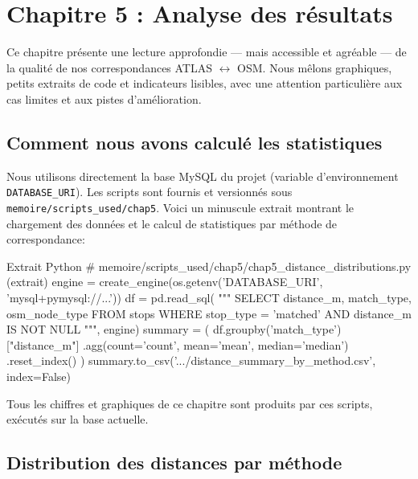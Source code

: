 \chapter{Chapitre 5 : Analyse des résultats}

Ce chapitre présente une lecture approfondie — mais accessible et agréable — de la qualité de nos correspondances ATLAS $\leftrightarrow$ OSM. Nous mêlons graphiques, petits extraits de code et indicateurs lisibles, avec une attention particulière aux cas limites et aux pistes d'amélioration.

\section{Comment nous avons calculé les statistiques}

Nous utilisons directement la base MySQL du projet (variable d'environnement \texttt{DATABASE\_URI}). Les scripts sont fournis et versionnés sous \texttt{memoire/scripts\_used/chap5}. Voici un minuscule extrait montrant le chargement des données et le calcul de statistiques par méthode de 
correspondance:

\begin{codebox}[language=Python]{Extrait Python}
# memoire/scripts_used/chap5/chap5_distance_distributions.py (extrait)
engine = create_engine(os.getenv('DATABASE_URI', 'mysql+pymysql://...'))
df = pd.read_sql(
    """
    SELECT distance_m, match_type, osm_node_type
    FROM stops
    WHERE stop_type = 'matched' AND distance_m IS NOT NULL
    """, engine)
summary = (
  df.groupby('match_type')["distance_m"]
    .agg(count='count', mean='mean', median='median')
    .reset_index()
)
summary.to_csv('.../distance_summary_by_method.csv', index=False)
\end{codebox}

Tous les chiffres et graphiques de ce chapitre sont produits par ces scripts, exécutés sur la base actuelle.

\section{Distribution des distances par méthode}

